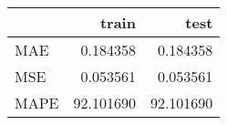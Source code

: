 \begin{tabular}{lrr}
\toprule
{} &      train &       test \\
\midrule
MAE  &   0.184358 &   0.184358 \\
MSE  &   0.053561 &   0.053561 \\
MAPE &  92.101690 &  92.101690 \\
\bottomrule
\end{tabular}
